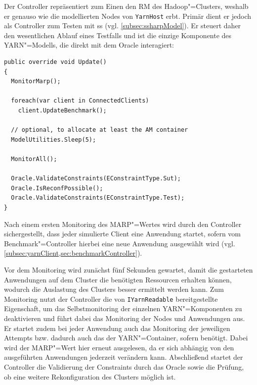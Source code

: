 Der Controller repräsentiert zum Einen den \gls{RM} des Hadoop"=Clusters, weshalb er genauso wie die modellierten Nodes von \texttt{YarnHost} erbt.
Primär dient er jedoch als Controller zum Testen mit \gls{ss} (vgl. \cref{subsec:ssharpModel}).
Er steuert daher den wesentlichen Ablauf eines Testfalls und ist die einzige Komponente des YARN"=Modells, die direkt mit dem Oracle interagiert:

\begin{lstlisting}[label=lst:controllerUpdate,style=cs,
caption={[Update()"=Methode des Controllers]
    \texttt{Update()}"=Methode des Controllers (gekürzt).
    Eine ausführliche Beschreibung des Ablaufs der Ausführung eines Testfalls findet sich in \cref{subsec:simulationStep}.}]
public override void Update()
{
  MonitorMarp();
  
  foreach(var client in ConnectedClients)
    client.UpdateBenchmark();
  
  // optional, to allocate at least the AM container
  ModelUtilities.Sleep(5);
  
  MonitorAll();
  
  Oracle.ValidateConstraints(EConstraintType.Sut);
  Oracle.IsReconfPossible();
  Oracle.ValidateConstraints(EConstraintType.Test);
}
\end{lstlisting}

Nach einem ersten Monitoring des \gls{MARP}"=Wertes wird durch den Controller sichergestellt, dass jeder simulierte Client eine Anwendung startet, sofern vom Benchmark"=Controller hierbei eine neue Anwendung ausgewählt wird (vgl. \cref{subsec:yarnClient,sec:benchmarkController}).

Vor dem Monitoring wird zunächst fünf Sekunden gewartet, damit die gestarteten Anwendungen auf dem Cluster die benötigten Ressourcen erhalten können, wodurch die Auslastung des Clusters besser ermittelt werden kann.
Zum Monitoring nutzt der Controller die von \texttt{IYarnReadable} bereitgestellte Eigenschaft, um das Selbstmonitoring der einzelnen YARN"=Komponenten zu deaktivieren und führt dabei das Monitoring der Nodes und Anwendungen aus.
Er startet zudem bei jeder Anwendung auch das Monitoring der jeweiligen Attempts bzw. dadurch auch das der YARN"=Container, sofern benötigt.
Dabei wird der \gls{MARP}"=Wert hier erneut ausgelesen, da er sich abhängig von den ausgeführten Anwendungen jederzeit verändern kann.
Abschließend startet der Controller die Validierung der Constraints durch das Oracle sowie die Prüfung, ob eine weitere Rekonfiguration des Clusters möglich ist.

